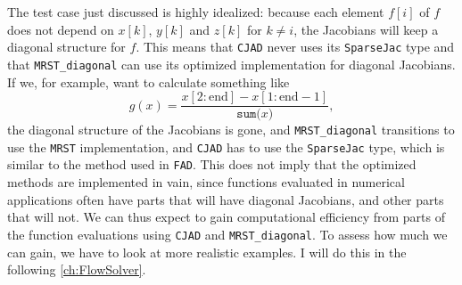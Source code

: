 The test case just discussed is highly idealized: because each element $f[i]$ of $f$ does not depend on $x[k]$, $y[k]$ and $z[k]$ for $k\not=i$, the Jacobians will keep a diagonal structure for $f$. This means that \texttt{CJAD} never uses its \texttt{SparseJac} type and that \texttt{MRST\_diagonal} can use its optimized implementation for diagonal Jacobians. If we, for example, want to calculate something like
\begin{equation*}
g(x) = \frac{x\left[2:\text{end}\right] - x\left[1:\text{end}-1\right]}{\texttt{sum(}x\texttt{)}},
\end{equation*}
the diagonal structure of the Jacobians is gone, and \texttt{MRST\_diagonal} transitions to use the \texttt{MRST} implementation, and \texttt{CJAD} has to use the \texttt{SparseJac} type, which is similar to the method used in \texttt{FAD}. This does not imply that the optimized methods are implemented in vain, since functions evaluated in numerical applications often have parts that will have diagonal Jacobians, and other parts that will not. We can thus expect to gain computational efficiency from parts of the function evaluations using \texttt{CJAD} and \texttt{MRST\_diagonal}. To assess how much we can gain, we have to look at more realistic examples. I will do this in the following \autoref{ch:FlowSolver}. 

